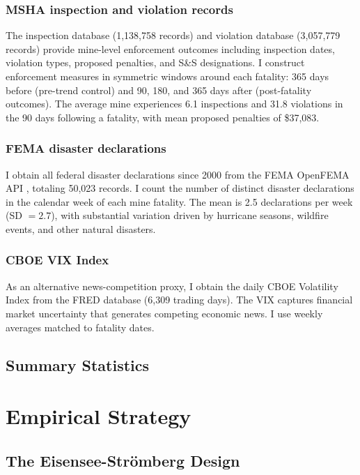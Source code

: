 \documentclass[12pt]{article}
\begin{document}
\subsubsection*{MSHA inspection and violation records} The inspection database (1,138,758 records) and violation database (3,057,779 records) provide mine-level enforcement outcomes including inspection dates, violation types, proposed penalties, and S\&S designations. I construct enforcement measures in symmetric windows around each fatality: 365 days before (pre-trend control) and 90, 180, and 365 days after (post-fatality outcomes). The average mine experiences 6.1 inspections and 31.8 violations in the 90 days following a fatality, with mean proposed penalties of \$37,083.

\subsubsection*{FEMA disaster declarations} I obtain all federal disaster declarations since 2000 from the FEMA OpenFEMA API \citep{fema2024disasters}, totaling 50,023 records. I count the number of distinct disaster declarations in the calendar week of each mine fatality. The mean is 2.5 declarations per week (SD $= 2.7$), with substantial variation driven by hurricane seasons, wildfire events, and other natural disasters.

\subsubsection*{CBOE VIX Index} As an alternative news-competition proxy, I obtain the daily CBOE Volatility Index from the FRED database (6,309 trading days). The VIX captures financial market uncertainty that generates competing economic news. I use weekly averages matched to fatality dates.

\subsection{Summary Statistics}




\section{Empirical Strategy}

\subsection{The Eisensee-Str\"{o}mberg Design}
\end{document}
